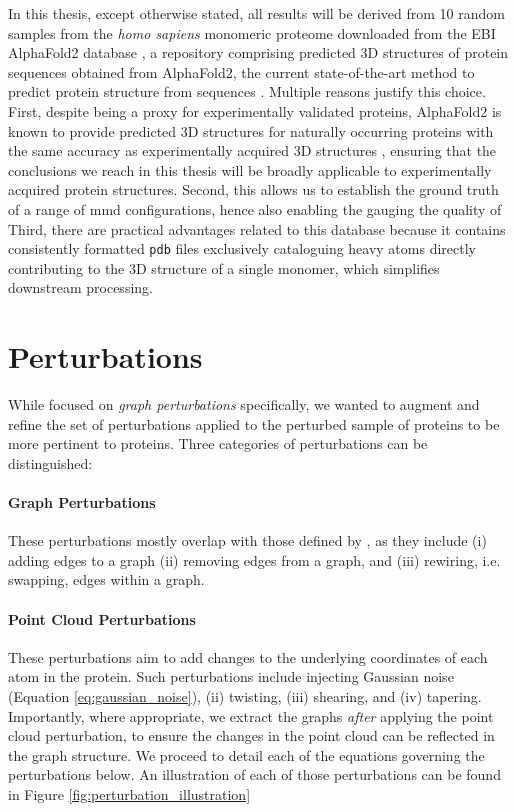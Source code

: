 In this thesis, except otherwise stated, all results will be derived from 10
random samples from the \textit{homo sapiens} monomeric proteome downloaded from
the EBI AlphaFold2 database
\citep{varadi2022alphafold,tunyasuvunakool2021highly}, a repository comprising
predicted 3D structures of protein sequences obtained from AlphaFold2, the
current state-of-the-art method to predict protein structure from sequences
\citep{jumper2021highly}. Multiple reasons justify this choice. First, despite
being a proxy for experimentally validated proteins, AlphaFold2 is known to
provide predicted 3D structures for naturally occurring proteins with the same
accuracy as experimentally acquired 3D structures \citep{jumper2021highly},
ensuring that the conclusions we reach in this thesis will be broadly applicable
to experimentally acquired protein structures. Second, this allows us to
establish the ground truth of a range of \acrshort{mmd} configurations, hence
also enabling the gauging the quality of Third, there are practical advantages
related to this database because it contains consistently formatted \texttt{pdb}
files exclusively cataloguing heavy atoms directly contributing to the 3D
structure of a single monomer, which simplifies downstream processing.

\section{Perturbations}

While \cite{obray2022evaluation} focused on \emph{graph perturbations} specifically,
we wanted to augment and refine the set of perturbations applied to the perturbed
sample of proteins to be more pertinent to proteins. Three
categories of perturbations can be distinguished:

\paragraph{Graph Perturbations} These perturbations mostly overlap with those
defined by \cite{obray2022evaluation}, as they include (i) adding edges to a graph
(ii) removing edges from a graph, and (iii) rewiring, i.e. swapping, edges within a
graph.
\paragraph{Point Cloud Perturbations} These perturbations aim to add changes
to the underlying coordinates of each atom in the protein. Such
perturbations include injecting Gaussian noise (Equation
\ref{eq:gaussian_noise}), (ii) twisting, (iii) shearing, and
(iv) tapering. Importantly, where appropriate, we extract the graphs \emph{after} applying the
point cloud perturbation, to ensure the changes in the point cloud can be
reflected in the graph structure. We proceed to detail each of the equations governing the
perturbations below. An illustration of each of those perturbations can be found
in Figure \ref{fig:perturbation_illustration}

